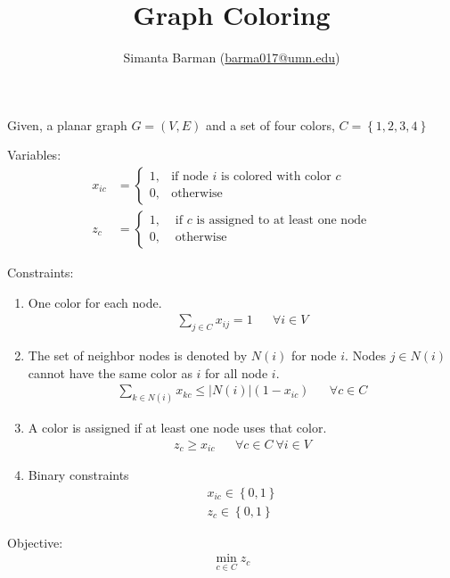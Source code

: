 \documentclass[11pt]{article}
\title{Graph Coloring}
\author{Simanta Barman (\href{mailto:barma017@umn.edu}{barma017@umn.edu})}
\date{}
\begin{document}
\maketitle

Given, a planar graph $G = (V, E)$ and a set of four colors, $C = \left\lbrace 1, 2, 3, 4 \right\rbrace$

Variables:
\begin{align}
    x_{ic} & = \begin{cases}
        1, & \text{if node $i$ is colored with color $c$} \\
        0, & \text{otherwise}
    \end{cases}\\
    z_c & = \begin{cases}
        1, &\text{ if $c$ is assigned to at least one node}\\
        0, &\text{ otherwise}
    \end{cases}
\end{align}

Constraints:
\begin{enumerate}
    \item One color for each node. 
    \begin{align}
        \sum\limits_{j \in C} x_{ij} = 1 && \forall i \in V
    \end{align}
    \item The set of neighbor nodes is denoted by $N(i)$ for node $i$. Nodes $j \in N(i)$ cannot have the same color as $i$
    for all node $i$.
    \begin{align}
        \sum\limits_{k \in N(i)} x_{kc} \leq |N(i)| (1 - x_{ic}) && \forall c \in C
    \end{align}
    \item A color is assigned if at least one node uses that color.
    \begin{align}
        z_c \geq x_{ic} && \forall c \in C ~\forall i \in V
    \end{align}
    \item Binary constraints
    \begin{align}
        x_{ic} \in \left\lbrace 0, 1 \right\rbrace \\
        z_c \in \left\lbrace 0, 1 \right\rbrace 
    \end{align}
\end{enumerate}

Objective:
\begin{align}
    \min\limits_{c \in C} z_c
\end{align}
\end{document}
